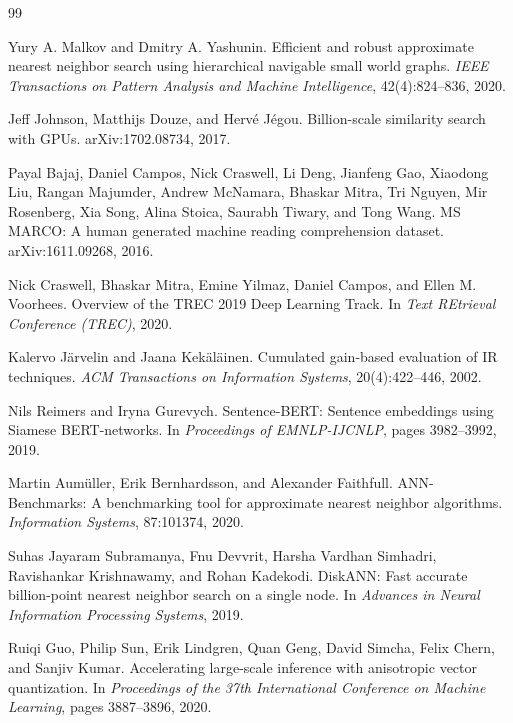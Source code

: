 \documentclass[10pt,twocolumn]{article}
\begin{document}
\begin{thebibliography}{99}

Yury A. Malkov and Dmitry A. Yashunin.
\newblock Efficient and robust approximate nearest neighbor search using hierarchical navigable small world graphs.
\newblock \emph{IEEE Transactions on Pattern Analysis and Machine Intelligence}, 42(4):824--836, 2020.

Jeff Johnson, Matthijs Douze, and Herv\'e J\'egou.
\newblock Billion-scale similarity search with GPUs.
\newblock arXiv:1702.08734, 2017.

Payal Bajaj, Daniel Campos, Nick Craswell, Li Deng, Jianfeng Gao, Xiaodong Liu, Rangan Majumder, Andrew McNamara, Bhaskar Mitra, Tri Nguyen, Mir Rosenberg, Xia Song, Alina Stoica, Saurabh Tiwary, and Tong Wang.
\newblock MS MARCO: A human generated machine reading comprehension dataset.
\newblock arXiv:1611.09268, 2016.

Nick Craswell, Bhaskar Mitra, Emine Yilmaz, Daniel Campos, and Ellen M. Voorhees.
\newblock Overview of the TREC 2019 Deep Learning Track.
\newblock In \emph{Text REtrieval Conference (TREC)}, 2020.

Kalervo J\"arvelin and Jaana Kek\"al\"ainen.
\newblock Cumulated gain-based evaluation of IR techniques.
\newblock \emph{ACM Transactions on Information Systems}, 20(4):422--446, 2002.

Nils Reimers and Iryna Gurevych.
\newblock Sentence-BERT: Sentence embeddings using Siamese BERT-networks.
\newblock In \emph{Proceedings of EMNLP-IJCNLP}, pages 3982--3992, 2019.

Martin Aum\"uller, Erik Bernhardsson, and Alexander Faithfull.
\newblock ANN-Benchmarks: A benchmarking tool for approximate nearest neighbor algorithms.
\newblock \emph{Information Systems}, 87:101374, 2020.

Suhas Jayaram Subramanya, Fnu Devvrit, Harsha Vardhan Simhadri, Ravishankar Krishnawamy, and Rohan Kadekodi.
\newblock DiskANN: Fast accurate billion-point nearest neighbor search on a single node.
\newblock In \emph{Advances in Neural Information Processing Systems}, 2019.

Ruiqi Guo, Philip Sun, Erik Lindgren, Quan Geng, David Simcha, Felix Chern, and Sanjiv Kumar.
\newblock Accelerating large-scale inference with anisotropic vector quantization.
\newblock In \emph{Proceedings of the 37th International Conference on Machine Learning}, pages 3887--3896, 2020.


\end{thebibliography}
\end{document}

